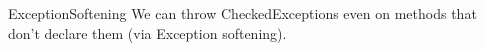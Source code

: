 \begin{pattern}{ExceptionSoftening}
We can throw CheckedExceptions even on methods that don't declare them (via Exception softening).

\instances

\end{pattern}